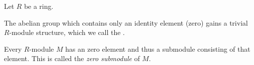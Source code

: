 \documentclass{article}
\begin{document}
Let $R$ be a ring.

The abelian group which contains only an identity element (zero) 
gains a trivial $R$-module structure, 
which we call the {}.

Every $R$-module $M$ has an zero element 
and thus a submodule consisting of that element.
This is called the {\it zero submodule} of $M$.
\end{document}
